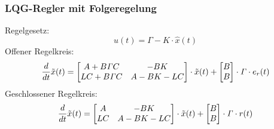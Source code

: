      \subsubsection{LQG-Regler mit Folgeregelung}
        Regelgesetz:
        \begin{equation*}
            u(t) = \mathit{\Gamma}-K\cdot\widehat{x}(t)
        \end{equation*}
        Offener Regelkreis:
        \begin{equation*}
            \frac{d}{dt}\Tilde{x}(t) = 
            \begin{bmatrix}
            A +B\mathit{\Gamma}C   & -BK\\
            LC +B\mathit{\Gamma}C  &   A-BK-LC
            \end{bmatrix}\cdot\Tilde{x}(t) +
            \begin{bmatrix} B\\ B\end{bmatrix}\cdot \mathit{\Gamma}\cdot e_r(t)
        \end{equation*}
        Geschlossener Regelkreis:
        \begin{equation*}
            \frac{d}{dt}\Tilde{x}(t) = 
            \begin{bmatrix}
            A   & -BK\\
            LC &   A-BK-LC
            \end{bmatrix}\cdot\Tilde{x}(t) +
            \begin{bmatrix} B\\ B\end{bmatrix}\cdot \mathit{\Gamma}\cdot r(t)
        \end{equation*}
        
